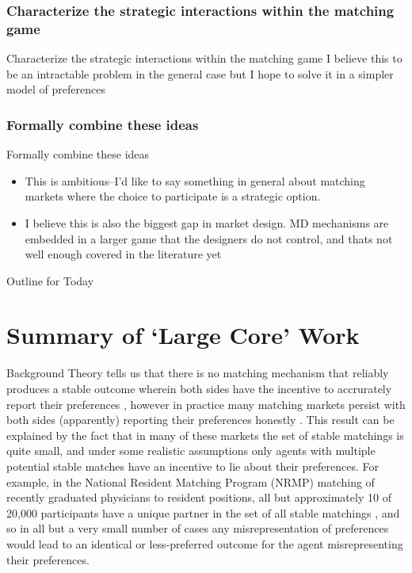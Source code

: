 \documentclass{beamer}
\begin{document}
\subsubsection{Characterize the strategic interactions within the matching game}
\begin{frame}{Characterize the strategic interactions within the matching game}
	I believe this to be an intractable problem in the general case but I hope to solve it in a simpler model of preferences
\end{frame}

\subsubsection{Formally combine these ideas}
\begin{frame}{Formally combine these ideas}
	\begin{itemize}
		\item This is ambitious--I'd like to say something in general about matching markets where the choice to participate is a strategic option.  
		\item I believe this is also the biggest gap in market design. MD mechanisms are embedded in a larger game that the designers do not control, and thats not well enough covered in the literature yet
	\end{itemize}
	 
\end{frame}

\begin{frame}{Outline for Today}
	\tableofcontents
\end{frame}

\section{ Summary of `Large Core' Work}
\begin{frame}{Background}
    Theory tells us that there is no matching mechanism that reliably produces a stable outcome wherein both sides have the incentive to accrurately report their preferences \citep{Roth1985}, however in practice many matching markets persist with both sides (apparently) reporting their preferences honestly  \citep{Roth1991}. This result can be explained by the fact that in many of these markets the set of stable matchings is quite small, and under some realistic assumptions only agents with multiple potential stable matches have an incentive to lie about their preferences.  For example, in the National Resident Matching Program (NRMP) matching of recently graduated physicians to resident positions, all but approximately 10 of 20,000 participants have a unique partner in the set of all stable matchings \citep{Roth1999a}, and so in all but a very small number of cases any misrepresentation of preferences would lead to an identical or less-preferred outcome for the agent misrepresenting their preferences. 
\end{frame}
\end{document}
